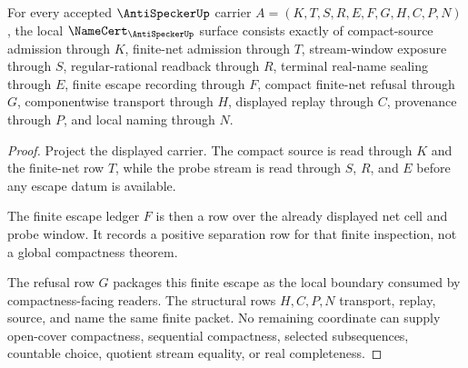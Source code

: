 \begin{theorem}
\label{thm:anti-specker-namecert-obligations}
For every accepted $\AntiSpeckerUp$ carrier $A=(K,T,S,R,E,F,G,H,C,P,N)$, the local $\NameCert_{\AntiSpeckerUp}$ surface consists exactly of compact-source admission through $K$, finite-net admission through $T$, stream-window exposure through $S$, regular-rational readback through $R$, terminal real-name sealing through $E$, finite escape recording through $F$, compact finite-net refusal through $G$, componentwise transport through $H$, displayed replay through $C$, provenance through $P$, and local naming through $N$.
\end{theorem}
\begin{proof}
Project the displayed carrier. The compact source is read through $K$ and the finite-net row $T$, while the probe stream is read through $S$, $R$, and $E$ before any escape datum is available.

The finite escape ledger $F$ is then a row over the already displayed net cell and probe window. It records a positive separation row for that finite inspection, not a global compactness theorem.

The refusal row $G$ packages this finite escape as the local boundary consumed by compactness-facing readers. The structural rows $H,C,P,N$ transport, replay, source, and name the same finite packet. No remaining coordinate can supply open-cover compactness, sequential compactness, selected subsequences, countable choice, quotient stream equality, or real completeness.
\end{proof}

